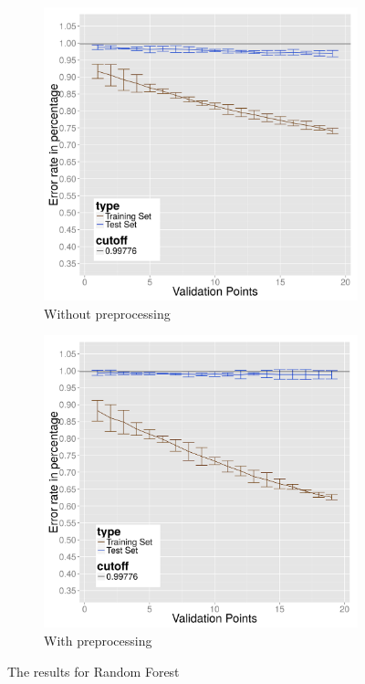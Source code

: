 \begin{figure}
  \centering
    \begin{subfigure}{.5\linewidth}
      \centering
      \includegraphics[width=0.95\linewidth]{Images/DRFraw}
      \caption{Without preprocessing}
      \label{fig:random-forest-resized}
    \end{subfigure}%
    \begin{subfigure}{.5\linewidth}
      \centering
      \includegraphics[width=0.95\linewidth]{Images/DRFpreprocessed}
      \caption{With preprocessing}
      \label{fig:random-forest-preprocessed}
    \end{subfigure}
  \caption{The results for Random Forest}
  \label{fig:random-forest}
\end{figure}

